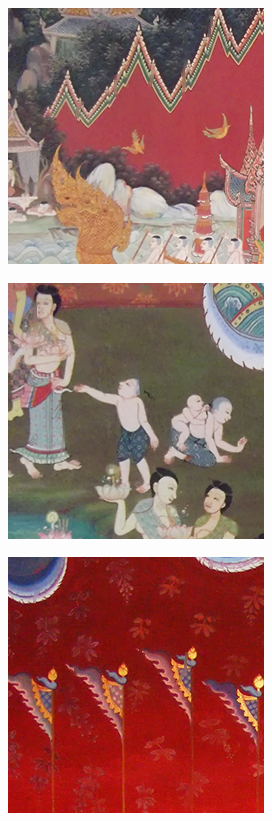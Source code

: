 \begin{figure}[H]
    \centering
    \begin{subfigure}{\ResultSubFigureWidth \linewidth}
        \centering
        \includegraphics[width=\ResultSubFigurePadding \linewidth]{image/result_ex4/splitbergman_case01.png}
    \end{subfigure}
    \begin{subfigure}{\ResultSubFigureWidth \linewidth}
        \centering
        \includegraphics[width=\ResultSubFigurePadding \linewidth]{image/result_ex4/splitbergman_case02.png}
    \end{subfigure}
    \begin{subfigure}{\ResultSubFigureWidth \linewidth}
        \centering
        \includegraphics[width=\ResultSubFigurePadding \linewidth]{image/result_ex4/splitbergman_case03.png}			

\end{subfigure}
\end{figure}
